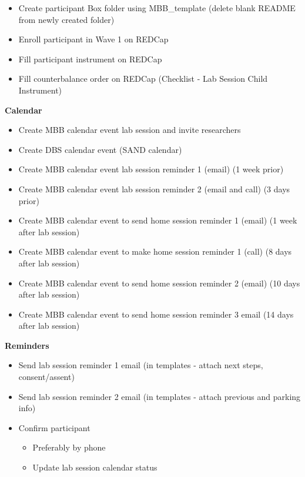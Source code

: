 \documentclass[]{book}
\providecommand{\tightlist}{%
  \setlength{\itemsep}{0pt}\setlength{\parskip}{0pt}}
\begin{document}
\begin{itemize}
\tightlist
\item
  Create participant Box folder using MBB\_template (delete blank README from newly created folder)
\item
  Enroll participant in Wave 1 on REDCap
\item
  Fill participant instrument on REDCap
\item
  Fill counterbalance order on REDCap (Checklist - Lab Session Child Instrument)
\end{itemize}

\textbf{Calendar}

\begin{itemize}
\tightlist
\item
  Create MBB calendar event lab session and invite researchers
\item
  Create DBS calendar event (SAND calendar)
\item
  Create MBB calendar event lab session reminder 1 (email) (1 week prior)
\item
  Create MBB calendar event lab session reminder 2 (email and call) (3 days prior)
\item
  Create MBB calendar event to send home session reminder 1 (email) (1 week after lab session)
\item
  Create MBB calendar event to make home session reminder 1 (call) (8 days after lab session)
\item
  Create MBB calendar event to send home session reminder 2 (email) (10 days after lab session)
\item
  Create MBB calendar event to send home session reminder 3 email (14 days after lab session)
\end{itemize}

\textbf{Reminders}

\begin{itemize}
\tightlist
\item
  Send lab session reminder 1 email (in templates - attach next steps, consent/assent)
\item
  Send lab session reminder 2 email (in templates - attach previous and parking info)
\item
  Confirm participant

  \begin{itemize}
  \tightlist
  \item
    Preferably by phone
  \item
    Update lab session calendar status
  \end{itemize}
\end{itemize}
\end{document}
